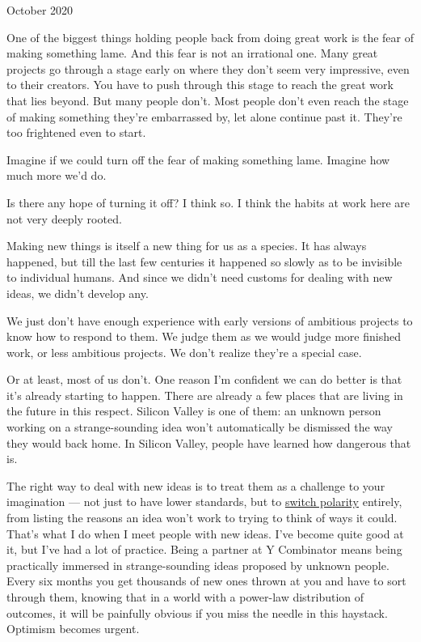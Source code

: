 October 2020

One of the biggest things holding people back from doing great work is
the fear of making something lame. And this fear is not an irrational
one. Many great projects go through a stage early on where they don't
seem very impressive, even to their creators. You have to push through
this stage to reach the great work that lies beyond. But many people
don't. Most people don't even reach the stage of making something
they're embarrassed by, let alone continue past it. They're too
frightened even to start.

Imagine if we could turn off the fear of making something lame. Imagine
how much more we'd do.

Is there any hope of turning it off? I think so. I think the habits at
work here are not very deeply rooted.

Making new things is itself a new thing for us as a species. It has
always happened, but till the last few centuries it happened so slowly
as to be invisible to individual humans. And since we didn't need
customs for dealing with new ideas, we didn't develop any.

We just don't have enough experience with early versions of ambitious
projects to know how to respond to them. We judge them as we would judge
more finished work, or less ambitious projects. We don't realize they're
a special case.

Or at least, most of us don't. One reason I'm confident we can do better
is that it's already starting to happen. There are already a few places
that are living in the future in this respect. Silicon Valley is one of
them: an unknown person working on a strange-sounding idea won't
automatically be dismissed the way they would back home. In Silicon
Valley, people have learned how dangerous that is.

The right way to deal with new ideas is to treat them as a challenge to
your imagination --- not just to have lower standards, but to
\href{altair.html}{switch polarity} entirely, from listing the reasons
an idea won't work to trying to think of ways it could. That's what I do
when I meet people with new ideas. I've become quite good at it, but
I've had a lot of practice. Being a partner at Y Combinator means being
practically immersed in strange-sounding ideas proposed by unknown
people. Every six months you get thousands of new ones thrown at you and
have to sort through them, knowing that in a world with a power-law
distribution of outcomes, it will be painfully obvious if you miss the
needle in this haystack. Optimism becomes urgent.

